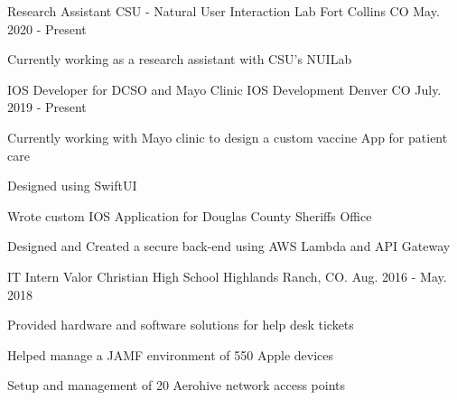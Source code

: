 \vspace{-2.0mm}

\begin{cventries}
\cventry
{Research Assistant} %
{CSU - Natural User Interaction Lab} %
{Fort Collins CO} %
{May. 2020 - Present} %
{
  \begin{cvitems} %
    \item {Currently working as a research assistant with CSU's NUILab}
    \end{cvitems}
}
  \cventry
    {IOS Developer for DCSO and Mayo Clinic} %
    {IOS Development} %
    {Denver CO} %
    {July. 2019 - Present} %
    {
      \begin{cvitems} %
        \item {Currently working with Mayo clinic to design a custom vaccine App for patient care}
        \item {Designed using SwiftUI}
        \item {Wrote custom IOS Application for Douglas County Sheriffs Office}
        \item {Designed and Created a secure back-end using AWS Lambda and API Gateway}
        \end{cvitems}
}
  \cventry
    {IT Intern} %
    {Valor Christian High School} %
    {Highlands Ranch, CO.} %
    {Aug. 2016 - May. 2018} %
    {
      \begin{cvitems} %
        \item {Provided hardware and software solutions for help desk tickets}
        \item {Helped manage a JAMF environment of 550 Apple devices}
        \item {Setup and management of 20 Aerohive network access points}
      \end{cvitems}
    }


\end{cventries}
